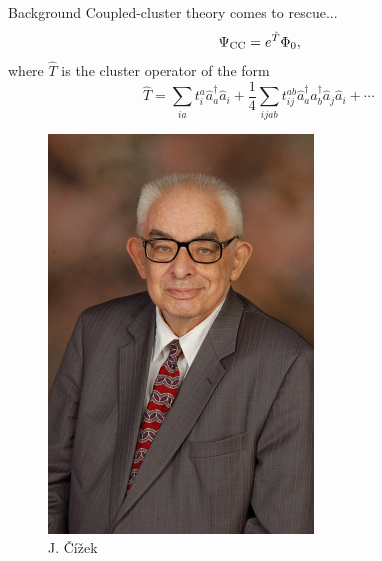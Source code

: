 \documentclass{beamer}
\begin{document}
\begin{frame}{Background}
 Coupled-cluster theory comes to rescue...
  \begin{equation}
   \Psi_{\rm CC} = e^{\hat{T}} \Phi_0,
  \end{equation}
   where $\hat{T}$ is the cluster operator of the form
   \begin{equation}
    \hat{T} = \sum_{ia} t_i^a \hat{a}^\dagger_a \hat{a}_i + \frac{1}{4}\sum_{ijab} t_{ij}^{ab} \hat{a}^\dagger_a \hat{a}^\dagger_b \hat{a}_j \hat{a}_i + \cdots \,
   \end{equation}
   \begin{multicols}{2}
   \begin{figure}
   \includegraphics[scale=0.2]{figures/Cizek.jpg}\\
   J. {\v C}{\'i}{\v z}ek
   \end{figure}


\end{multicols}
\end{frame}
\end{document}
